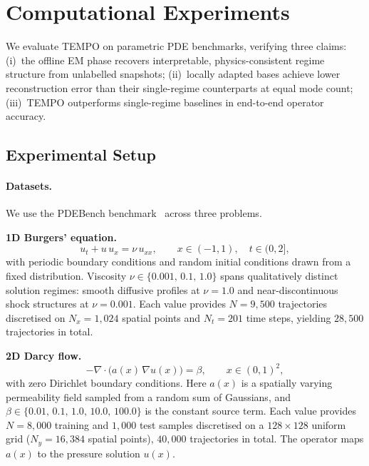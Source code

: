\documentclass{article}
\begin{document}
\clearpage

\section{Computational Experiments}
\label{sec:exp}

We evaluate TEMPO on parametric PDE benchmarks, verifying three claims:
(i)~the offline EM phase recovers interpretable, physics-consistent regime
structure from unlabelled snapshots;
(ii)~locally adapted bases achieve lower reconstruction error than their
single-regime counterparts at equal mode count;
(iii)~TEMPO outperforms single-regime baselines in end-to-end operator accuracy.

\subsection{Experimental Setup}
\label{sec:setup}

\paragraph{Datasets.}
We use the PDEBench benchmark~\cite{Takamoto2022} across three problems.

\textbf{1D Burgers' equation.}
\begin{equation}
  u_t + u\,u_x = \nu\,u_{xx},
  \qquad x\in(-1,1),\quad t\in(0,2],
  \label{eq:burgers}
\end{equation}
with periodic boundary conditions and random initial conditions drawn from a
fixed distribution.
Viscosity $\nu\in\{0.001,\,0.1,\,1.0\}$ spans qualitatively distinct
solution regimes: smooth diffusive profiles at $\nu{=}1.0$ and
near-discontinuous shock structures at $\nu{=}0.001$.
Each value provides $N{=}9{,}500$ trajectories discretised on $N_x{=}1{,}024$
spatial points and $N_t{=}201$ time steps, yielding $28{,}500$ trajectories in total.

\textbf{2D Darcy flow.}
\begin{equation}
  -\nabla\cdot\bigl(a(x)\,\nabla u(x)\bigr) = \beta,
  \qquad x\in(0,1)^2,
  \label{eq:darcy}
\end{equation}
with zero Dirichlet boundary conditions.
Here $a(x)$ is a spatially varying permeability field sampled from a
random sum of Gaussians, and $\beta\in\{0.01,\,0.1,\,1.0,\,10.0,\,100.0\}$
is the constant source term.
Each value provides $N{=}8{,}000$ training and $1{,}000$ test samples
discretised on a $128{\times}128$ uniform grid ($N_y{=}16{,}384$ spatial points),
$40{,}000$ trajectories in total.
The operator maps $a(x)$ to the pressure solution $u(x)$.
\end{document}

